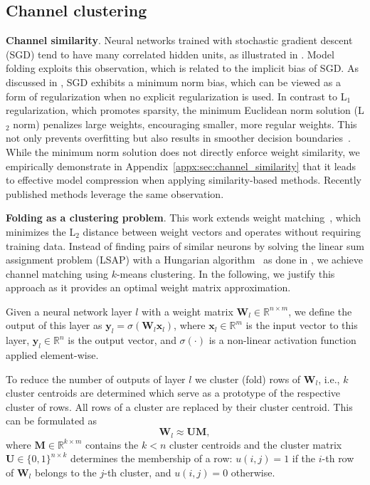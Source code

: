 \documentclass{article}
\newcommand\fakeparagraph[1]{\par\noindent\textbf{{#1}}.\xspace}
\begin{document}
\subsection{Channel clustering}

\fakeparagraph{Channel similarity}
Neural networks trained with stochastic gradient descent (SGD) tend to have many correlated hidden units, as illustrated in . Model folding exploits this observation, which is related to the implicit bias of SGD. As discussed in \citep{gunasekar2017implicitregularizationmatrixfactorization}, SGD exhibits a minimum norm bias, which can be viewed as a form of regularization when no explicit regularization is used. In contrast to L$_1$ regularization, which promotes sparsity, the minimum Euclidean norm solution (L$_2$ norm) penalizes large weights, encouraging smaller, more regular weights. This not only prevents overfitting but also results in smoother decision boundaries~\citep{Bishop2006}. While the minimum norm solution does not directly enforce weight similarity, we empirically demonstrate in Appendix~\ref{appx:sec:channel_similarity} that it leads to effective model compression when applying similarity-based methods. Recently published methods \citep{stoica2024zipitmergingmodelsdifferent,chen2023going} leverage the same observation.

\fakeparagraph{Folding as a clustering problem} 
This work extends weight matching~\citep{ainsworth2023git}, which minimizes the L$_2$ distance between weight vectors and operates without requiring training data. Instead of finding pairs of similar neurons by solving the linear sum assignment problem (LSAP) with a Hungarian algorithm~\citep{Kuhn2010TheHM} as done in \citep{jordan2022repair, ainsworth2023git}, we achieve channel matching using $k$-means clustering. In the following, we justify this approach as it provides an optimal weight matrix approximation. 

Given a neural network layer $l$ with a weight matrix $\mathbf{W}_l \in \mathbb{R}^{n \times m}$, we define the output of this layer as $\mathbf{y}_l = \sigma(\mathbf{W}_l \mathbf{x}_l)$, where \( \mathbf{x}_l \in \mathbb{R}^m \) is the input vector to this layer, \( \mathbf{y}_l \in \mathbb{R}^n \) is the output vector, and \( \sigma(\cdot) \) is a non-linear activation function applied element-wise.

To reduce the number of outputs of layer $l$ we cluster (fold) rows of $\mathbf{W}_l$, i.e., $k$ cluster centroids are determined which serve as a prototype of the respective cluster of rows. All rows of a cluster are replaced by their cluster centroid. This can be formulated as 
\[
\mathbf{W}_l \approx \mathbf{U} \mathbf{M},
\]
where $\mathbf{M} \in \mathbb{R}^{k \times m}$ contains the $k < n$ cluster centroids and the cluster matrix $\mathbf{U} \in \{0, 1\}^{n \times k}$ determines the membership of a row: $u(i,j) = 1$ if the $i$-th row of $\mathbf{W}_l$ belongs to the $j$-th cluster, and $u(i,j) = 0$ otherwise. 
\end{document}
